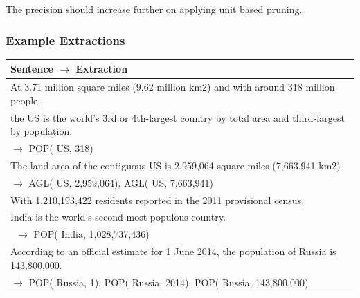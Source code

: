 \documentclass[a4paper,10pt]{article}
\begin{document}
The precision should increase further on applying unit based pruning.

\subsubsection{Example Extractions}
\begin{tabular}{|l|} 
\hline
Sentence $\rightarrow$ Extraction \\
\hline
At 3.71 million square miles (9.62 million km2) and with around 318 million people,\\ 
the US is the world's 3rd or 4th-largest country by total area and third-largest by population. \\$\rightarrow$ POP( US, 318) \\
\hline
The land area of the contiguous US is 2,959,064 square miles (7,663,941 km2)\\ $\rightarrow$  AGL( US, 2,959,064), AGL( US, 7,663,941) \\
\hline
With 1,210,193,422 residents reported in the 2011 provisional census,\\ 
India is the world's second-most populous country.\\\ $\rightarrow$ POP( India, 1,028,737,436)\\ 
\hline
According to an official estimate for 1 June 2014, the population of Russia is 143,800,000.\\ $\rightarrow$
POP( Russia, 1), POP( Russia, 2014), POP( Russia, 143,800,000) \\
\hline
\end{tabular}




\end{document}
